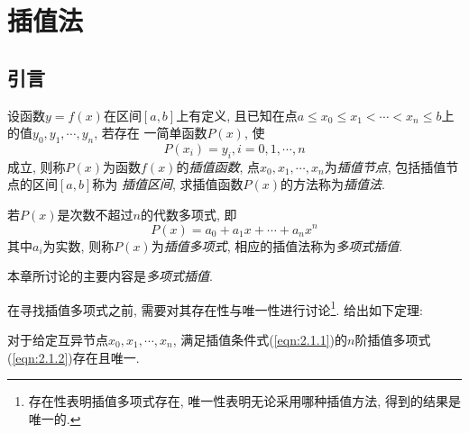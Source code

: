 \chapter{插值法}

\section{引言}

\begin{definition}[插值法]
    设函数$y=f(x)$在区间$[a,b]$上有定义, 且已知在点$a\le x_0\le x_1<\cdots<x_n\le b$上的值$y_0,y_1,\cdots,y_n$, 若存在
    一简单函数$P(x)$, 使
    \begin{equation}\label{eqn:2.1.1}
        P(x_i) = y_i,i=0,1,\cdots,n
    \end{equation}
    成立, 则称$P(x)$为函数$f(x)$的\emph{插值函数}, 点$x_0,x_1,\cdots,x_n$为\emph{插值节点}, 包括插值节点的区间$[a,b]$称为
    \emph{插值区间}, 求插值函数$P(x)$的方法称为\emph{插值法}.
\end{definition}

\begin{definition}[多项式插值]
    若$P(x)$是次数不超过$n$的代数多项式, 即
    \begin{equation}\label{eqn:2.1.2}
        P(x) = a_0+a_1x+\cdots+a_nx^n
    \end{equation}
    其中$a_i$为实数, 则称$P(x)$为\emph{插值多项式}, 相应的插值法称为\emph{多项式插值}.
\end{definition}

本章所讨论的主要内容是\emph{多项式插值}.

在寻找插值多项式之前, 需要对其存在性与唯一性进行讨论\footnote{存在性表明插值多项式存在, 唯一性表明无论采用哪种插值方法,
得到的结果是唯一的.}. 给出如下定理:

\begin{theorem}
    对于给定互异节点$x_0,x_1,\cdots,x_n$, 满足插值条件式(\ref{eqn:2.1.1})的$n$阶插值多项式(\ref{eqn:2.1.2})存在且唯一.
\end{theorem}

